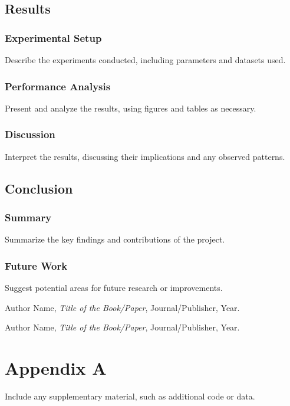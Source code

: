 \documentclass[12pt]{article}
\begin{document}
\section{Results}
\subsection{Experimental Setup}
Describe the experiments conducted, including parameters and datasets used.

\subsection{Performance Analysis}
Present and analyze the results, using figures and tables as necessary.

\subsection{Discussion}
Interpret the results, discussing their implications and any observed patterns.

\section{Conclusion}
\subsection{Summary}
Summarize the key findings and contributions of the project.

\subsection{Future Work}
Suggest potential areas for future research or improvements.

\begin{thebibliography}{9}
Author Name, \textit{Title of the Book/Paper}, Journal/Publisher, Year.

Author Name, \textit{Title of the Book/Paper}, Journal/Publisher, Year.

\end{thebibliography}

\appendix
\chapter{Appendix A}
Include any supplementary material, such as additional code or data.
\end{document}
